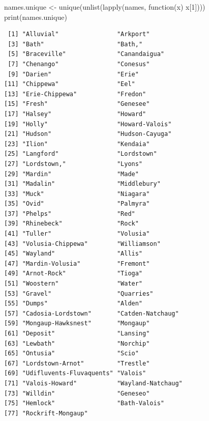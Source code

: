 \documentclass[
  letterpaper,
  DIV=11,
  numbers=noendperiod]{scrartcl}
\newenvironment{Shaded}{\begin{snugshade}}{\end{snugshade}}
\newcommand{\ControlFlowTok}[1]{\textcolor[rgb]{0.00,0.23,0.31}{#1}}
\newcommand{\DecValTok}[1]{\textcolor[rgb]{0.68,0.00,0.00}{#1}}
\newcommand{\FunctionTok}[1]{\textcolor[rgb]{0.28,0.35,0.67}{#1}}
\newcommand{\NormalTok}[1]{\textcolor[rgb]{0.00,0.23,0.31}{#1}}
\newcommand{\OtherTok}[1]{\textcolor[rgb]{0.00,0.23,0.31}{#1}}
\begin{document}
\begin{Shaded}
\begin{Highlighting}[]
\NormalTok{names.unique }\OtherTok{\textless{}{-}} \FunctionTok{unique}\NormalTok{(}\FunctionTok{unlist}\NormalTok{(}\FunctionTok{lapply}\NormalTok{(names, }\ControlFlowTok{function}\NormalTok{(x) x[}\DecValTok{1}\NormalTok{])))}
\FunctionTok{print}\NormalTok{(names.unique)}
\end{Highlighting}
\end{Shaded}

\begin{verbatim}
 [1] "Alluvial"                "Arkport"                
 [3] "Bath"                    "Bath,"                  
 [5] "Braceville"              "Canandaigua"            
 [7] "Chenango"                "Conesus"                
 [9] "Darien"                  "Erie"                   
[11] "Chippewa"                "Eel"                    
[13] "Erie-Chippewa"           "Fredon"                 
[15] "Fresh"                   "Genesee"                
[17] "Halsey"                  "Howard"                 
[19] "Holly"                   "Howard-Valois"          
[21] "Hudson"                  "Hudson-Cayuga"          
[23] "Ilion"                   "Kendaia"                
[25] "Langford"                "Lordstown"              
[27] "Lordstown,"              "Lyons"                  
[29] "Mardin"                  "Made"                   
[31] "Madalin"                 "Middlebury"             
[33] "Muck"                    "Niagara"                
[35] "Ovid"                    "Palmyra"                
[37] "Phelps"                  "Red"                    
[39] "Rhinebeck"               "Rock"                   
[41] "Tuller"                  "Volusia"                
[43] "Volusia-Chippewa"        "Williamson"             
[45] "Wayland"                 "Allis"                  
[47] "Mardin-Volusia"          "Fremont"                
[49] "Arnot-Rock"              "Tioga"                  
[51] "Woostern"                "Water"                  
[53] "Gravel"                  "Quarries"               
[55] "Dumps"                   "Alden"                  
[57] "Cadosia-Lordstown"       "Catden-Natchaug"        
[59] "Mongaup-Hawksnest"       "Mongaup"                
[61] "Deposit"                 "Lansing"                
[63] "Lewbath"                 "Norchip"                
[65] "Ontusia"                 "Scio"                   
[67] "Lordstown-Arnot"         "Trestle"                
[69] "Udifluvents-Fluvaquents" "Valois"                 
[71] "Valois-Howard"           "Wayland-Natchaug"       
[73] "Willdin"                 "Geneseo"                
[75] "Hemlock"                 "Bath-Valois"            
[77] "Rockrift-Mongaup"       
\end{verbatim}
\end{document}
